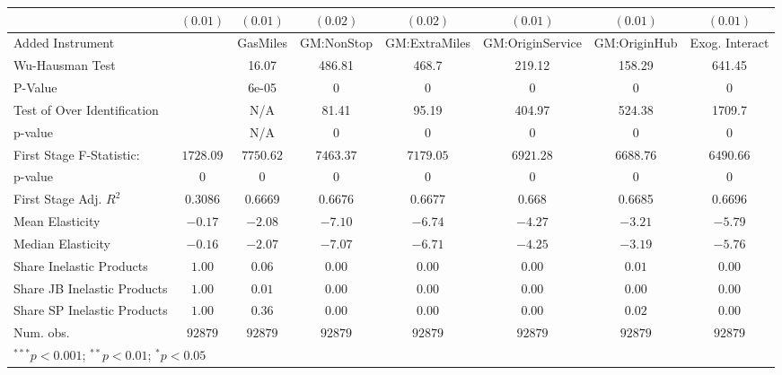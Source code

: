 \begin{tabular}{l c c c c c c c}
                             & $(0.01)$      & $(0.01)$      & $(0.02)$      & $(0.02)$      & $(0.01)$         & $(0.01)$      & $(0.01)$       \\
\midrule
Added Instrument             &               & GasMiles      & GM:NonStop    & GM:ExtraMiles & GM:OriginService & GM:OriginHub  & Exog. Interact \\
Wu-Hausman Test              &               & 16.07         & 486.81        & 468.7         & 219.12           & 158.29        & 641.45         \\
P-Value                      &               & 6e-05         & 0             & 0             & 0                & 0             & 0              \\
Test of Over Identification  &               & N/A           & 81.41         & 95.19         & 404.97           & 524.38        & 1709.7         \\
p-value                      &               & N/A           & 0             & 0             & 0                & 0             & 0              \\
First Stage F-Statistic:     & $1728.09$     & $7750.62$     & $7463.37$     & $7179.05$     & $6921.28$        & $6688.76$     & $6490.66$      \\
p-value                      & $0$           & $0$           & $0$           & $0$           & $0$              & $0$           & $0$            \\
First Stage Adj. $R^2$       & 0.3086        & 0.6669        & 0.6676        & 0.6677        & 0.668            & 0.6685        & 0.6696         \\
Mean Elasticity              & $-0.17$       & $-2.08$       & $-7.10$       & $-6.74$       & $-4.27$          & $-3.21$       & $-5.79$        \\
Median Elasticity            & $-0.16$       & $-2.07$       & $-7.07$       & $-6.71$       & $-4.25$          & $-3.19$       & $-5.76$        \\
Share Inelastic Products     & $1.00$        & $0.06$        & $0.00$        & $0.00$        & $0.00$           & $0.01$        & $0.00$         \\
Share JB Inelastic Products  & $1.00$        & $0.01$        & $0.00$        & $0.00$        & $0.00$           & $0.00$        & $0.00$         \\
Share SP Inelastic Products  & $1.00$        & $0.36$        & $0.00$        & $0.00$        & $0.00$           & $0.02$        & $0.00$         \\
Num. obs.                    & $92879$       & $92879$       & $92879$       & $92879$       & $92879$          & $92879$       & $92879$        \\
\bottomrule
\multicolumn{8}{l}{\scriptsize{$^{***}p<0.001$; $^{**}p<0.01$; $^{*}p<0.05$}}
\end{tabular}
